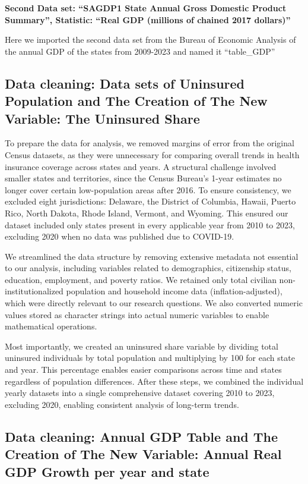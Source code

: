 \documentclass[
]{article}
\begin{document}
\textbf{Second Data set: ``SAGDP1 State Annual Gross Domestic Product
Summary'', Statistic: ``Real GDP (millions of chained 2017 dollars)''}

Here we imported the second data set from the Bureau of Economic
Analysis of the annual GDP of the states from 2009-2023 and named it
``table\_GDP''

\subsection{Data cleaning: Data sets of Uninsured Population and The
Creation of The New Variable: The Uninsured
Share}\label{data-cleaning-data-sets-of-uninsured-population-and-the-creation-of-the-new-variable-the-uninsured-share}

To prepare the data for analysis, we removed margins of error from the
original Census datasets, as they were unnecessary for comparing overall
trends in health insurance coverage across states and years. A
structural challenge involved smaller states and territories, since the
Census Bureau's 1-year estimates no longer cover certain low-population
areas after 2016. To ensure consistency, we excluded eight
jurisdictions: Delaware, the District of Columbia, Hawaii, Puerto Rico,
North Dakota, Rhode Island, Vermont, and Wyoming. This ensured our
dataset included only states present in every applicable year from 2010
to 2023, excluding 2020 when no data was published due to COVID-19.

We streamlined the data structure by removing extensive metadata not
essential to our analysis, including variables related to demographics,
citizenship status, education, employment, and poverty ratios. We
retained only total civilian non-institutionalized population and
household income data (inflation-adjusted), which were directly relevant
to our research questions. We also converted numeric values stored as
character strings into actual numeric variables to enable mathematical
operations.

Most importantly, we created an uninsured share variable by dividing
total uninsured individuals by total population and multiplying by 100
for each state and year. This percentage enables easier comparisons
across time and states regardless of population differences. After these
steps, we combined the individual yearly datasets into a single
comprehensive dataset covering 2010 to 2023, excluding 2020, enabling
consistent analysis of long-term trends.

\subsection{Data cleaning: Annual GDP Table and The Creation of The New
Variable: Annual Real GDP Growth per year and
state}\label{data-cleaning-annual-gdp-table-and-the-creation-of-the-new-variable-annual-real-gdp-growth-per-year-and-state}
\end{document}
